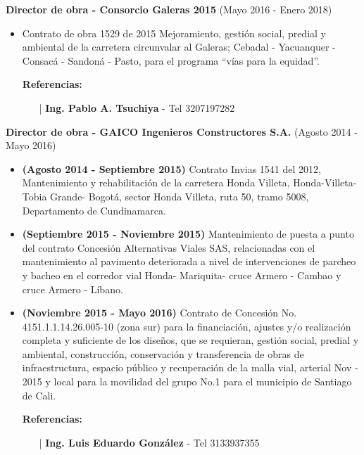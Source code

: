 \documentclass[letterpaper,10pt]{article}
\begin{document}
  \vspace*{0.1cm}
  \textbf{Director de obra - Consorcio Galeras 2015} (Mayo 2016 - Enero 2018)
  \hfill
  \vspace*{0.1cm}
  \begin{minipage}{\linewidth}
    \begin{itemize}[noitemsep]
      \item Contrato de obra 1529 de 2015 Mejoramiento, gestión social, predial y ambiental de la carretera circunvalar al Galeras; Cebadal - Yacuanquer - Consacá - Sandoná - Pasto, para el programa “vías para la equidad”. 
      \item [] \textbf{Referencias:}
      \begin{itemize}[noitemsep]
        \vspace*{-0.2cm}
        \item [|] \textbf{Ing. Pablo A. Tsuchiya} - Tel 3207197282
      \end{itemize}
    \end{itemize}
    \hfill
  \end{minipage}
 
  \newpage
  \vspace*{0.1cm}
  \textbf{Director de obra - GAICO Ingenieros Constructores S.A.} (Agosto 2014 - Mayo 2016)
  \hfill
  \vspace*{0.1cm}
  \begin{minipage}{\linewidth}
    \begin{itemize}[noitemsep]
      \item \textbf{(Agosto 2014 - Septiembre 2015)} Contrato Invias 1541 del 2012, Mantenimiento y rehabilitación de la carretera
      Honda Villeta, Honda-Villeta-Tobia Grande- Bogotá, sector Honda Villeta, ruta 50, tramo 5008, Departamento de Cundinamarca. 
      \item \textbf{(Septiembre 2015 - Noviembre 2015)} Mantenimiento de puesta a punto del contrato Concesión Alternativas Viales SAS, relacionadas con el mantenimiento al pavimento deteriorada a nivel de intervenciones de parcheo y bacheo en el corredor vial Honda- Mariquita- cruce Armero - Cambao y cruce Armero - Líbano.
      \item \textbf{(Noviembre 2015 - Mayo 2016)} Contrato de Concesión No. 4151.1.1.14.26.005-10 (zona sur) para la financiación, ajustes y/o realización completa y suficiente de los diseños, que se requieran, gestión social, predial y ambiental, construcción, conservación y transferencia de obras de infraestructura, espacio público y recuperación de la malla vial, arterial Nov - 2015 y local para la movilidad del grupo No.1 para el municipio de Santiago de Cali.
      \item [] \textbf{Referencias:}
      \begin{itemize}[noitemsep]
        \vspace*{-0.2cm}
        \item [|] \textbf{Ing. Luis Eduardo González} - Tel 3133937355
      \end{itemize}
    \end{itemize}
    \hfill
  \end{minipage}
\end{document}
